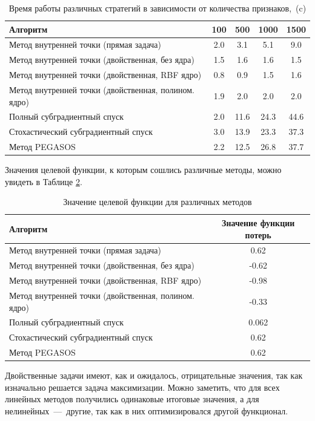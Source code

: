 \documentclass[12pt,fleqn,unicode]{article}
\begin{document}
\begin{table}[h!]
	\centering
	\begin{tabular}{|l|c|c|c|c|}
\hline
Алгоритм & 100 & 500 & 1000 & 1500 \\ \hline
Метод внутренней точки (прямая задача) & 2.0 & 3.1 & 5.1 & 9.0 \\ \hline
Метод внутренней точки (двойственная, без ядра) & 1.5 & 1.6 & 1.6 & 1.5 \\ \hline
Метод внутренней точки (двойственная, RBF ядро) & 0.8 & 0.9 & 1.5 & 1.6 \\ \hline
Метод внутренней точки (двойственная, полином. ядро) & 1.9 & 2.0 & 2.0 & 2.0 \\ \hline
Полный субградиентный спуск & 2.0 & 11.6 & 24.3 & 44.6 \\ \hline
Стохастический субградиентный спуск & 3.0 & 13.9 & 23.3 & 37.3 \\ \hline
Метод PEGASOS & 2.2 & 12.5 & 26.8 & 37.7 \\ \hline
	\end{tabular}
	\caption{Время работы различных стратегий в зависимости от количества признаков,~(c)}
	\label{tab2}
\end{table}

Значения целевой функции, к которым сошлись различные методы, можно увидеть в Таблице \ref{tab3}.

\begin{table}[h!]
	\centering
	\begin{tabular}{|l|c|}
\hline
Алгоритм & Значение функции потерь \\ \hline
Метод внутренней точки (прямая задача) & 0.62 \\ \hline
Метод внутренней точки (двойственная, без ядра) & -0.62 \\ \hline
Метод внутренней точки (двойственная, RBF ядро) & -0.98 \\ \hline
Метод внутренней точки (двойственная, полином. ядро) & -0.33 \\ \hline
Полный субградиентный спуск & 0.062 \\ \hline
Стохастический субградиентный спуск & 0.62 \\ \hline
Метод PEGASOS & 0.62 \\ \hline
	\end{tabular}
	\caption{Значение целевой функции для различных методов}
	\label{tab3}
\end{table}

Двойственные задачи имеют, как и ожидалось, отрицательные значения, так как изначально
решается задача максимизации.
Можно заметить, что для всех линейных методов получились одинаковые итоговые значения, а для 
нелинейных~---~другие, так как в них оптимизировался другой функционал.
\end{document}
